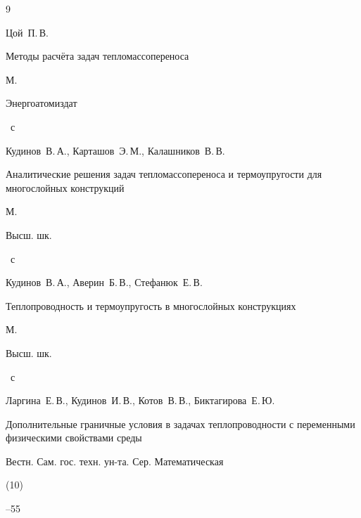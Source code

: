 \begin{thebibliography}{9}




\by Цой~П.\,В.

\book Методы расчёта задач тепломассопереноса

\publaddr М.

\publ Энергоатомиздат


~с




\by Кудинов~В.\,А., Карташов~Э.\,М., Калашников~В.\,В.

\book Аналитические решения задач тепломассопереноса и термоупругости для многослойных конструкций

\publaddr М.

\publ Высш. шк.


~с




\by Кудинов~В.\,А., Аверин~Б.\,В., Стефанюк~Е.\,В.

\book Теплопроводность и термоупругость в многослойных конструкциях

\publaddr М.

\publ Высш. шк.


~с




\by Ларгина~Е.\,В., Кудинов~И.\,В., Котов~В.\,В., Биктагирова~Е.\,Ю.

\paper Дополнительные граничные условия в задачах теплопроводности с переменными физическими свойствами среды

\jour Вестн. Сам. гос. техн. ун-та. Сер. Математическая


(10)

--55



\end{thebibliography}





\makeengtitlem





%

